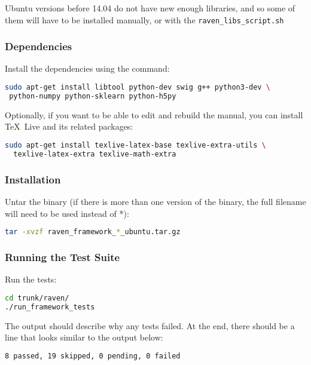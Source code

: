 Ubuntu versions before 14.04 do not have new enough libraries, and so
some of them will have to be installed manually, or with the
\verb'raven_libs_script.sh'

\subsubsection{Dependencies}
Install the dependencies using the command:

\begin{lstlisting}[language=bash]
sudo apt-get install libtool python-dev swig g++ python3-dev \
 python-numpy python-sklearn python-h5py
\end{lstlisting}


Optionally, if you want to be able to edit and rebuild the manual, you can
install \TeX~Live and its related packages:
\begin{lstlisting}[language=bash]
sudo apt-get install texlive-latex-base texlive-extra-utils \
  texlive-latex-extra texlive-math-extra
\end{lstlisting}

\subsubsection{Installation}
Untar the binary (if there is more than one version of the
binary, the full filename will need to be used instead of *):

\begin{lstlisting}[language=bash]
tar -xvzf raven_framework_*_ubuntu.tar.gz
\end{lstlisting}

\subsubsection{Running the Test Suite}
Run the tests:

\begin{lstlisting}[language=bash]
cd trunk/raven/
./run_framework_tests
\end{lstlisting}

The output should describe why any tests failed.
%
At the end, there should be a line that looks similar to the output below:
\begin{lstlisting}[language=bash]
8 passed, 19 skipped, 0 pending, 0 failed
\end{lstlisting}

